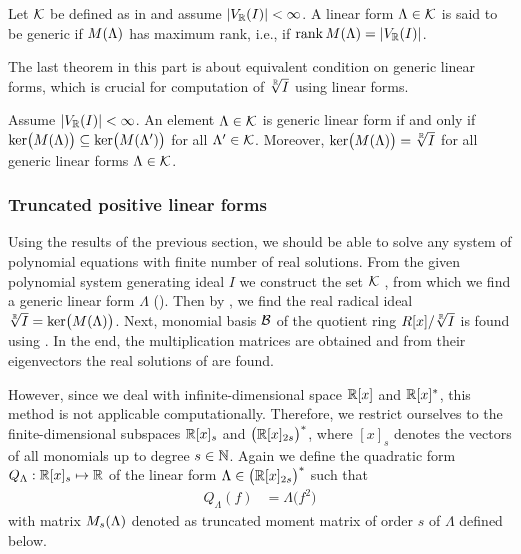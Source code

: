 \begin{definition}
  Let $\mathcal{K}$ be defined as in  and assume $|V_{\mathbb{R}}(I)|<\infty$.
  A linear form $\Lambda\in\mathcal{K}$ is said to be generic if $M(\Lambda)$ has maximum rank, i.e., if $\operatorname{rank}M(\Lambda) = |V_{\mathbb{R}}(I)|$.
\end{definition}

The last theorem in this part is about equivalent condition on generic linear forms, which is crucial for computation of $\sqrt[\mathbb{R}]{I}$ using linear forms.

\begin{theorem}
  Assume $|V_{\mathbb{R}}(I)|<\infty$.
  An element $\Lambda\in\mathcal{K}$ is generic linear form if and only if $\operatorname{ker}\!\big(M(\Lambda)\big)\subseteq \operatorname{ker}\!\big(M(\Lambda^\prime)\big)$ for all $\Lambda^\prime\in\mathcal{K}$.
  Moreover, $\operatorname{ker}\!\big(M(\Lambda)\big) = \sqrt[\mathbb{R}]{I}$ for all generic linear forms $\Lambda\in\mathcal{K}$.
\end{theorem}

\subsubsection{Truncated positive linear forms}
Using the results of the previous section, we should be able to solve any system of polynomial equations with finite number of real solutions.
From the given polynomial system  generating ideal $I$ we construct the set $\mathcal{K}$ , from which we find a generic linear form $\Lambda$ ().
Then by , we find the real radical ideal $\sqrt[\mathbb{R}]{I} = \operatorname{ker}\!\big(M(\Lambda)\big)$.
Next, monomial basis $\mathcal{B}$ of the quotient ring $R[x]/\sqrt[\mathbb{R}]{I}$ is found using .
In the end, the multiplication matrices are obtained and from their eigenvectors the real solutions of  are found.

However, since we deal with infinite-dimensional space $\mathbb{R}[x]$ and $\mathbb{R}[x]^*$, this method is not applicable computationally.
Therefore, we restrict ourselves to the finite-dimensional subspaces $\mathbb{R}[x]_s$ and $\big(\mathbb{R}[x]_{2s}\big)^*$, where $[x]_s$ denotes the vectors of all monomials up to degree $s\in\mathbb{N}$.
Again we define the quadratic form $Q_\Lambda:\mathbb{R}[x]_s\mapsto\mathbb{R}$ of the linear form $\Lambda\in\big(\mathbb{R}[x]_{2s}\big)^*$ such that
\begin{align}
  Q_\Lambda(f) &= \Lambda\big(f^2\big)
\end{align}
with matrix $M_s(\Lambda)$ denoted as truncated moment matrix of order $s$ of $\Lambda$ defined below.


